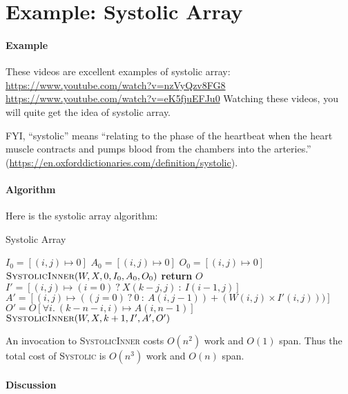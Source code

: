 \documentclass[11pt,a4paper,oneside,microtype,nokorean]{oblivoir}
\begin{document}
\section{Example: Systolic Array}

\paragraph{Example}

These videos are excellent examples of systolic array:
\url{https://www.youtube.com/watch?v=nzVyQzv8FG8} \url{https://www.youtube.com/watch?v=eK5fjuEFJu0}
Watching these videos, you will quite get the idea of systolic array.

FYI, ``systolic'' means ``relating to the phase of the heartbeat when the heart muscle contracts and
pumps blood from the chambers into the arteries.''
(\url{https://en.oxforddictionaries.com/definition/systolic}).


\paragraph{Algorithm}

Here is the systolic array algorithm:

\begin{algorithm}
  \caption{Systolic Array}\label{systolic}
  \begin{algorithmic}[1]
     
    \State $I_0 = [(i,j) \mapsto 0]$ 
    \State $A_0 = [(i,j) \mapsto 0]$ 
    \State $O_0 = [(i,j) \mapsto 0]$ 
    \State $\Call{SystolicInner}{W,X,0,I_0,A_0,O_0}$
    \EndProcedure
    \Statex
     
    \State \textbf{return} $O$
    \EndIf
    \State $I' = [(i,j) \mapsto (i=0)~?~X(k-j,j)~:~I(i-1,j)]$
    \State $A' = [(i,j) \mapsto ((j=0)~?~0~:~A(i,j-1)) + (W(i,j) \times I'(i,j)))]$
    \State $O' = O[\forall i.~(k-n-i,i) \mapsto A(i,n-1)]$
    \State $\Call{SystolicInner}{W,X,k+1,I',A',O'}$
    \EndProcedure
  \end{algorithmic}
\end{algorithm}

An invocation to \textsc{SystolicInner} costs $O(n^2)$ work and $O(1)$ span.  Thus the total cost of
\textsc{Systolic} is $O(n^3)$ work and $O(n)$ span.


\paragraph{Discussion}
\end{document}
